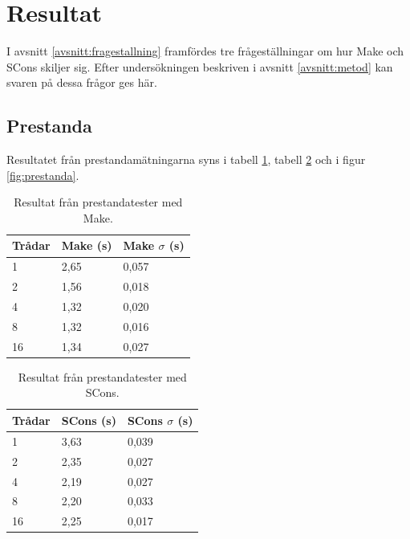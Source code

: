 \section{Resultat}
I avsnitt \ref{avsnitt:fragestallning} framfördes tre frågeställningar om hur Make och SCons skiljer sig. Efter undersökningen beskriven i avsnitt \ref{avsnitt:metod} kan svaren på dessa frågor ges här.

\subsection{Prestanda}
Resultatet från prestandamätningarna syns i tabell \ref{tabell:makeprestanda}, tabell \ref{tabell:sconsprestanda} och i figur \ref{fig:prestanda}.

\begin{table}[h!]
  \centering
  \begin{tabular}{|l|l|l|}
    \hline
    \textbf{Trådar} & \textbf{Make} (s) & \textbf{Make $\sigma$} (s) \\ \hline
    1 & 2,65 & 0,057 \\ \hline
    2 & 1,56 & 0,018 \\ \hline
    4 & 1,32 & 0,020 \\ \hline
    8 & 1,32 & 0,016 \\ \hline
    16 & 1,34 & 0,027 \\ \hline
  \end{tabular}
  \caption{Resultat från prestandatester med Make.}
  \label{tabell:makeprestanda}
\end{table}

\begin{table}[h!]
  \centering
  \begin{tabular}{|l|l|l|}
    \hline
    \textbf{Trådar} & \textbf{SCons} (s) & \textbf{SCons $\sigma$} (s) \\ \hline
    1 & 3,63 & 0,039 \\ \hline
    2 & 2,35 & 0,027 \\ \hline
    4 & 2,19 & 0,027 \\ \hline
    8 & 2,20 & 0,033 \\ \hline
    16 & 2,25 & 0,017 \\ \hline
  \end{tabular}
  \caption{Resultat från prestandatester med SCons.}
  \label{tabell:sconsprestanda}
\end{table}

